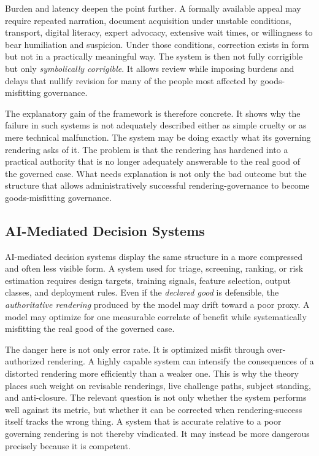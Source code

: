 \documentclass[11pt]{article}
\renewcommand{\emph}[1]{\textit{#1}}
\begin{document}
Burden and latency deepen the point further. A formally available appeal may require repeated narration, document acquisition under unstable conditions, transport, digital literacy, expert advocacy, extensive wait times, or willingness to bear humiliation and suspicion. Under those conditions, correction exists in form but not in a practically meaningful way. The system is then not fully corrigible but only \emph{symbolically corrigible}. It allows review while imposing burdens and delays that nullify revision for many of the people most affected by goods-misfitting governance.\cite{MoynihanHerdHarvey2015AdministrativeBurden,Eubanks2018AutomatingInequality}

The explanatory gain of the framework is therefore concrete. It shows why the failure in such systems is not adequately described either as simple cruelty or as mere technical malfunction. The system may be doing exactly what its governing rendering asks of it. The problem is that the rendering has hardened into a practical authority that is no longer adequately answerable to the real good of the governed case. What needs explanation is not only the bad outcome but the structure that allows administratively successful rendering-governance to become goods-misfitting governance.

\subsection{AI-Mediated Decision Systems}

AI-mediated decision systems display the same structure in a more compressed and often less visible form. A system used for triage, screening, ranking, or risk estimation requires design targets, training signals, feature selection, output classes, and deployment rules. Even if the \emph{declared good} is defensible, the \emph{authoritative rendering} produced by the model may drift toward a poor proxy. A model may optimize for one measurable correlate of benefit while systematically misfitting the real good of the governed case.\cite{SelbstEtAl2019FairnessAbstraction,ObermeyerEtAl2019DissectingRacialBias}

The danger here is not only error rate. It is optimized misfit through over-authorized rendering. A highly capable system can intensify the consequences of a distorted rendering more efficiently than a weaker one. This is why the theory places such weight on revisable renderings, live challenge paths, subject standing, and anti-closure. The relevant question is not only whether the system performs well against its metric, but whether it can be corrected when rendering-success itself tracks the wrong thing. A system that is accurate relative to a poor governing rendering is not thereby vindicated. It may instead be more dangerous precisely because it is competent.
\end{document}
